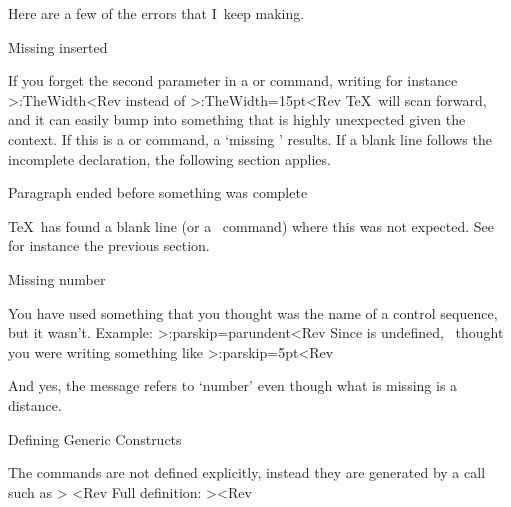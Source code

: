 Here are a few of the errors that I~keep making.

\SubSection Missing  inserted

If you forget the second parameter in a  or
 command, writing for instance
 \Ver>\Distance:TheWidth<Rev
instead of \Ver>\Distance:TheWidth=15pt<Rev
 \TeX\ will scan
forward, and it can easily bump into something that is highly
unexpected given the context. If this is a  or 
command, a `missing ' results. If a blank line follows
the incomplete declaration, the following section applies.

\SubSection  Paragraph ended before something was complete

\TeX\ has found a blank line (or a~ command) where this was
not expected. See for instance the previous section.

\SubSection Missing number

You have used something that you thought was the name of a control
sequence, but it wasn't. Example:
\Ver>\Distance:parskip=parundent<Rev
Since  is undefined, \Lollipop\ thought you were
writing something like
 \Ver>\Distance:parskip=5pt<Rev

And yes, the message refers to `number' even though what is missing
is a distance.

\ImpNote
\iSection Defining Generic Constructs

The  commands are not defined explicitly, instead they
are generated by a call such as
\Ver>    <Rev
Full definition:
\Ver>\def\@GenericConstruct#1{<Rev
to be used as \ver>\@GenericConstruct{Foo}>;
\Ver>    \append@to@list{@gencons}{\\#1;}<Rev
book keeping of existing generic constructs;
\Ver>    \csarg\newtoks{#1@defaults}
    \csn #1@defaults\ecs{}<Rev
default commands to be executed whenever 
an instance of this construct
is defined;
\Ver>    \csarg\def{add@#1@default}##1%
             {\append@to@list{#1@defaults}{##1}}<Rev
the command \cs{add@Foo@default}
to add defaults for this construct;
\Ver>    \Install@Noops{#1}<Rev
possibility to generate error msgs for the use of an option that is
not allowed for this type of construct;
\Ver>    \csarg\def{Define#1}:##1 {<Rev
instances of this construct will be defined
by a statement like \ver>\DefineFoo:Bar>;
\Ver>        \def\@name{##1}\def\@class{#1}
        \Tmessage[def]{Defining a #1: ##1}<Rev
\ver>DefineFoo:Bar> leads to \cs{@name} begin \n{Bar},
\cs{@class} being \n{Foo};
\Ver>        \the\generic@defaults
        \csarg\the{#1@defaults}<Rev
unpack token lists of generic and specific default actions;
\Ver>        \Get@Items}<Rev
start recursive processing of list of options. This ends the
definition of \cs{DefineFoo}; the definition of 
\cs{@GenericConstruct} ends with
\Ver>    \csarg\def{@#1Option}##1%
       {\csarg\def{#1@##1}####1####2}<Rev
which defines the \cs{@FooOption} macro; see~\ref[imp:option].
\Ver>    }<Rev

